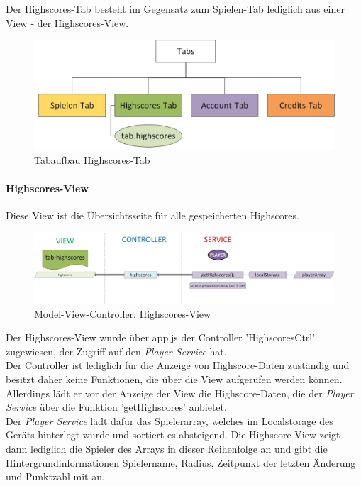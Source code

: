 Der Highscores-Tab besteht im Gegensatz zum Spielen-Tab lediglich aus einer View - der Highscores-View.
\begin{figure}[h]
\centering
\includegraphics[width=1\textwidth]{ref/images/tabs_highscores.png}
\caption[Tabaufbau Highscores-Tab]{Tabaufbau Highscores-Tab}
\label{fig:Tabaufbau Highscores-Tab}
\end{figure}


\paragraph{Highscores-View}
%
%
Diese View ist die Übersichtsseite für alle gespeicherten Highscores.
%
\begin{figure}[h]
\centering
\includegraphics[width=1\textwidth]{ref/images/06-highscores-tab.png}
\caption[Model-View-Controller: Highscores-View]{Model-View-Controller: Highscores-View}
\label{fig:MVC:Highscores-View}
\end{figure}


%
Der Highscores-View wurde über app.js der Controller 'HighscoresCtrl' zugewiesen, der Zugriff auf den \emph{Player Service} hat.
\\
Der Controller ist lediglich für die Anzeige von Highscore-Daten zuständig und besitzt daher keine Funktionen, die über die View aufgerufen werden können. Allerdings lädt er vor der Anzeige der View die Highscore-Daten, die der \emph{Player Service} über die Funktion 'getHighscores' anbietet.
\\
Der \emph{Player Service} lädt dafür das Spielerarray, welches im Localstorage des Geräts hinterlegt wurde und sortiert es absteigend. Die Highscore-View zeigt dann lediglich die Spieler des Arrays in dieser Reihenfolge an und gibt die Hintergrundinformationen Spielername, Radius, Zeitpunkt der letzten Änderung und Punktzahl mit an.
